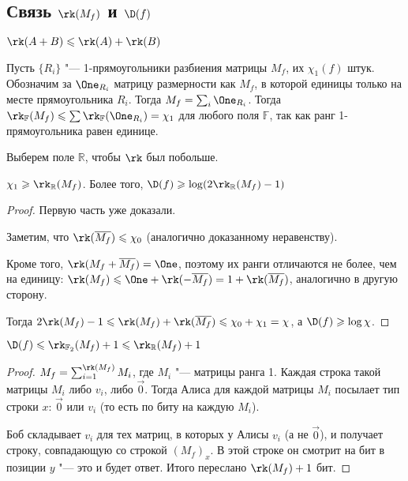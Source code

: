 \subsection{Связь \texorpdfstring{$\rk(M_f)$}{rk(M(f))} и \texorpdfstring{$\D(f)$}{D(f)}}
\begin{remark}
$\rk(A+B)\leqslant \rk(A) + \rk(B)$
\end{remark}

Пусть $\{R_i\}$ "--- 1-прямоугольники разбиения матрицы $M_f$, их $\chi_1(f)$ штук. Обозначим за $\One_{R_i}$ матрицу размерности как $M_f$, в которой единицы только на месте прямоугольника $R_i$.
Тогда $M_f = \sum_{i} \One_{R_i}$.
Тогда $\rk_\mathbb{F}(M_f)\leqslant \sum \rk_\mathbb{F}(\One_{R_i}) = \chi_1$ для любого поля $\mathbb{F}$, так как ранг 1-прямоугольника равен единице.

Выберем поле $\mathbb{R}$, чтобы $\rk$ был побольше.
\begin{theorem}
$\chi_1\geqslant \rk_\mathbb{R}(M_f)$.
Более того, $\D(f)\geqslant \log (2\rk_\mathbb{R}(M_f) - 1)$
\end{theorem}
\begin{proof}
Первую часть уже доказали.

Заметим, что $\rk(\overline{M_f})\leqslant \chi_0$ (аналогично доказанному неравенству).

Кроме того, $\rk(M_f+\overline{M_f}) = \One$, поэтому их ранги отличаются не более, чем на единицу: $\rk(M_f) \leqslant \One + \rk(-\overline{M_f}) = 1 + \rk(\overline{M_f})$, аналогично в другую сторону.

Тогда $2\rk(M_f)-1\leqslant \rk(M_f) + \rk(\overline{M_f})\leqslant \chi_0+\chi_1 = \chi$, а $\D(f)\geqslant \log \chi$.
\end{proof}

\begin{theorem}
$\D(f)\leqslant \rk_{\mathbb{F}_2}(M_f)+1\leqslant \rk_{\mathbb{R}}(M_f)+1$
\end{theorem}
\begin{proof}
$M_f = \sum^{\rk(M_f)}_{i = 1} M_i$, где $M_i$ "--- матрицы ранга 1. Каждая строка такой матрицы $M_i$ либо $v_i$, либо $\vec 0$.
Тогда Алиса для каждой матрицы $M_i$ посылает тип строки $x$: $\vec 0$ или $v_i$ (то есть по биту на каждую $M_i$).

Боб складывает $v_i$ для тех матриц, в которых у Алисы $v_i$ (а не $\vec 0$), и получает строку, совпадающую со строкой $(M_f)_x$. В этой строке он смотрит на бит в позиции $y$ "--- это и будет ответ. Итого переслано $\rk(M_f) + 1$ бит.
\end{proof}

